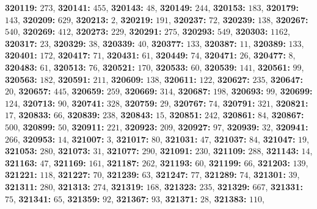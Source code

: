 \textsf{\bfseries 320119:} $273$, \textsf{\bfseries 320141:} $455$, \textsf{\bfseries 320143:} $48$, \textsf{\bfseries 320149:} $244$, \textsf{\bfseries 320153:} $183$, \textsf{\bfseries 320179:} $143$, \textsf{\bfseries 320209:} $629$, \textsf{\bfseries 320213:} $2$, \textsf{\bfseries 320219:} $191$, \textsf{\bfseries 320237:} $72$, \textsf{\bfseries 320239:} $138$, \textsf{\bfseries 320267:} $540$, \textsf{\bfseries 320269:} $412$, \textsf{\bfseries 320273:} $229$, \textsf{\bfseries 320291:} $275$, \textsf{\bfseries 320293:} $549$, \textsf{\bfseries 320303:} $1162$, \textsf{\bfseries 320317:} $23$, \textsf{\bfseries 320329:} $38$, \textsf{\bfseries 320339:} $40$, \textsf{\bfseries 320377:} $133$, \textsf{\bfseries 320387:} $11$, \textsf{\bfseries 320389:} $133$, \textsf{\bfseries 320401:} $172$, \textsf{\bfseries 320417:} $71$, \textsf{\bfseries 320431:} $61$, \textsf{\bfseries 320449:} $74$, \textsf{\bfseries 320471:} $26$, \textsf{\bfseries 320477:} $8$, \textsf{\bfseries 320483:} $61$, \textsf{\bfseries 320513:} $76$, \textsf{\bfseries 320521:} $170$, \textsf{\bfseries 320533:} $60$, \textsf{\bfseries 320539:} $141$, \textsf{\bfseries 320561:} $99$, \textsf{\bfseries 320563:} $182$, \textsf{\bfseries 320591:} $211$, \textsf{\bfseries 320609:} $138$, \textsf{\bfseries 320611:} $122$, \textsf{\bfseries 320627:} $235$, \textsf{\bfseries 320647:} $20$, \textsf{\bfseries 320657:} $445$, \textsf{\bfseries 320659:} $259$, \textsf{\bfseries 320669:} $314$, \textsf{\bfseries 320687:} $198$, \textsf{\bfseries 320693:} $99$, \textsf{\bfseries 320699:} $124$, \textsf{\bfseries 320713:} $90$, \textsf{\bfseries 320741:} $328$, \textsf{\bfseries 320759:} $29$, \textsf{\bfseries 320767:} $74$, \textsf{\bfseries 320791:} $321$, \textsf{\bfseries 320821:} $17$, \textsf{\bfseries 320833:} $66$, \textsf{\bfseries 320839:} $238$, \textsf{\bfseries 320843:} $15$, \textsf{\bfseries 320851:} $242$, \textsf{\bfseries 320861:} $84$, \textsf{\bfseries 320867:} $500$, \textsf{\bfseries 320899:} $50$, \textsf{\bfseries 320911:} $221$, \textsf{\bfseries 320923:} $209$, \textsf{\bfseries 320927:} $97$, \textsf{\bfseries 320939:} $32$, \textsf{\bfseries 320941:} $266$, \textsf{\bfseries 320953:} $14$, \textsf{\bfseries 321007:} $3$, \textsf{\bfseries 321017:} $80$, \textsf{\bfseries 321031:} $47$, \textsf{\bfseries 321037:} $84$, \textsf{\bfseries 321047:} $19$, \textsf{\bfseries 321053:} $280$, \textsf{\bfseries 321073:} $31$, \textsf{\bfseries 321077:} $290$, \textsf{\bfseries 321091:} $230$, \textsf{\bfseries 321109:} $288$, \textsf{\bfseries 321143:} $14$, \textsf{\bfseries 321163:} $47$, \textsf{\bfseries 321169:} $161$, \textsf{\bfseries 321187:} $262$, \textsf{\bfseries 321193:} $60$, \textsf{\bfseries 321199:} $66$, \textsf{\bfseries 321203:} $139$, \textsf{\bfseries 321221:} $118$, \textsf{\bfseries 321227:} $70$, \textsf{\bfseries 321239:} $63$, \textsf{\bfseries 321247:} $77$, \textsf{\bfseries 321289:} $74$, \textsf{\bfseries 321301:} $39$, \textsf{\bfseries 321311:} $280$, \textsf{\bfseries 321313:} $274$, \textsf{\bfseries 321319:} $168$, \textsf{\bfseries 321323:} $235$, \textsf{\bfseries 321329:} $667$, \textsf{\bfseries 321331:} $75$, \textsf{\bfseries 321341:} $65$, \textsf{\bfseries 321359:} $92$, \textsf{\bfseries 321367:} $93$, \textsf{\bfseries 321371:} $28$, \textsf{\bfseries 321383:} $110$, 
